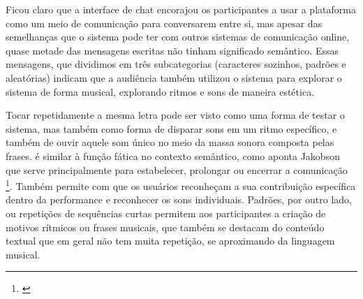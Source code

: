 
Ficou claro que a interface de chat encorajou os participantes a usar a plataforma como um meio de comunicação para conversarem entre si, mas apesar das semelhanças que o sistema pode ter com outros sistemas de comunicação online, quase metade das mensagens escritas não tinham significado semântico. Essas mensagens, que dividimos em três subcategorias (caracteres sozinhos, padrões e aleatórias) indicam que a audiência também utilizou o sistema para explorar o sistema de forma musical, explorando ritmos e sons de maneira estética.


Tocar repetidamente a mesma letra pode ser visto como uma forma de testar o sistema, mas também como forma de disparar sons em um ritmo específico, e também de ouvir aquele som único no meio da massa sonora composta pelas frases. é similar à função fática no contexto semântico, como aponta Jakobson que serve principalmente para estabelecer, prolongar ou encerrar a comunicação \footnote{\cite{Jakobson}}. Também permite com que os usuários reconheçam a sua contribuição específica dentro da performance e reconhecer os sons individuais. Padrões, por outro lado, ou repetições de sequências curtas permitem aos participantes a criação de motivos rítmicos ou frases musicais, que também se destacam do conteúdo textual que em geral não tem muita repetição, se aproximando da linguagem musical.

